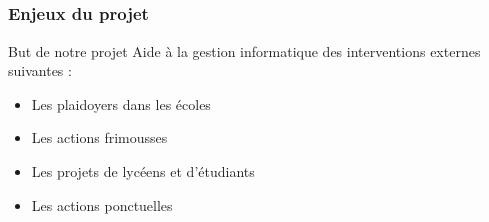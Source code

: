 \subsection{} %

\speaker{\Kafui}
\begin{frame}
\frametitle{Enjeux du projet}
	\begin{block}{But de notre projet}
		Aide à la gestion informatique des interventions externes suivantes :
		\begin{itemize}
			\item Les plaidoyers dans les \'ecoles
			\item Les actions frimousses
			\item Les projets de lycéens et d'étudiants
			\item Les actions ponctuelles
		\end{itemize}
	\end{block}
\end{frame}

